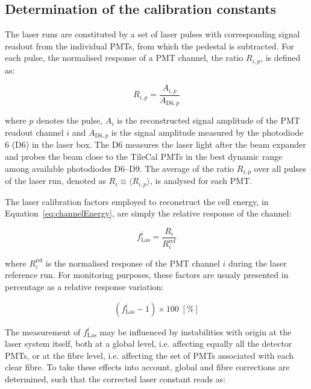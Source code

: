 \subsection{Determination of the calibration constants}
\label{sec:determination_of_the_calibration_constants}

The laser runs are constituted by a set of laser pulses with corresponding signal readout from the individual PMTs, from which the pedestal is subtracted. 
For each pulse, the normalised response of a PMT channel, the ratio $R_{i,p}$, is defined as:

\begin{equation}
    R_{i,p} = \frac{A_{i,p}}{A_{\mathrm{D6},{p}} }
    \label{eq:Rip}
\end{equation}

where $p$ denotes the pulse, $A_i$ is the reconstructed signal amplitude of the PMT readout channel $i$ and $A_{\mathrm{D6},{p}}$ is the signal amplitude measured by the photodiode 6 (D6) in the laser box. The D6 measures the laser light after the beam expander and probes the beam close to the TileCal PMTs in the best dynamic range among available photodiodes D6--D9. The average of the ratio $R_{i,p}$ over all pulses of the laser run, denoted as $R_i\equiv \langle R_{i,p}\rangle$, is analysed for each PMT.

The laser calibration factors employed to reconstruct the cell energy, in Equation~\ref{eq:channelEnergy}, are simply the relative response of the channel:

\begin{equation}
    f_{\mathrm{Las}}^i = \frac{R_i}{R_i^{\mathrm{ref}}}
    \label{eq:fLaser}
\end{equation}

where $R_i^{\mathrm{ref}}$ is the normalised response of the PMT channel $i$ during the laser reference run. For monitoring purposes, these factors are usualy presented in percentage as a relative response variation:

\begin{equation}
    (f_{\mathrm{Las}}^i - 1)\times 100\;[\%]
\label{eq:PMTdriftCorrected}
\end{equation}

The measurement of $f_{\mathrm{Las}}^i$ may be influenced by instabilities with origin at the laser system itself, both at a global level, i.e. affecting equally all the detector PMTs, or at the fibre level, i.e. affecting the set of PMTs associated with each clear fibre. To take these effects into account, global and fibre corrections are determined, such that the corrected laser constant reads as:

